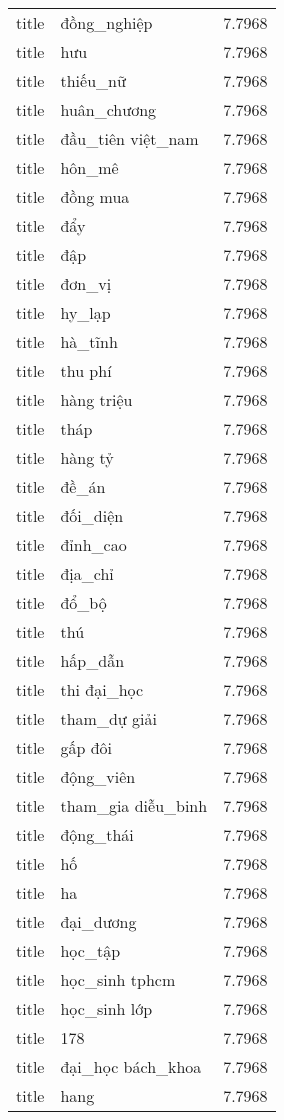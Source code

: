 \documentclass{article}
\begin{document}
\begin{tabular}{lll}
title & đồng\_nghiệp & 7.7968\\
title & hưu & 7.7968\\
title & thiếu\_nữ & 7.7968\\
title & huân\_chương & 7.7968\\
title & đầu\_tiên việt\_nam & 7.7968\\
title & hôn\_mê & 7.7968\\
title & đồng mua & 7.7968\\
title & đẩy & 7.7968\\
title & đập & 7.7968\\
title & đơn\_vị & 7.7968\\
title & hy\_lạp & 7.7968\\
title & hà\_tĩnh & 7.7968\\
title & thu phí & 7.7968\\
title & hàng triệu & 7.7968\\
title & tháp & 7.7968\\
title & hàng tỷ & 7.7968\\
title & đề\_án & 7.7968\\
title & đối\_diện & 7.7968\\
title & đỉnh\_cao & 7.7968\\
title & địa\_chỉ & 7.7968\\
title & đổ\_bộ & 7.7968\\
title & thú & 7.7968\\
title & hấp\_dẫn & 7.7968\\
title & thi đại\_học & 7.7968\\
title & tham\_dự giải & 7.7968\\
title & gấp đôi & 7.7968\\
title & động\_viên & 7.7968\\
title & tham\_gia diễu\_binh & 7.7968\\
title & động\_thái & 7.7968\\
title & hố & 7.7968\\
title & ha & 7.7968\\
title & đại\_dương & 7.7968\\
title & học\_tập & 7.7968\\
title & học\_sinh tphcm & 7.7968\\
title & học\_sinh lớp & 7.7968\\
title & 178 & 7.7968\\
title & đại\_học bách\_khoa & 7.7968\\
title & hang & 7.7968\\

\end{tabular}
\end{document}
